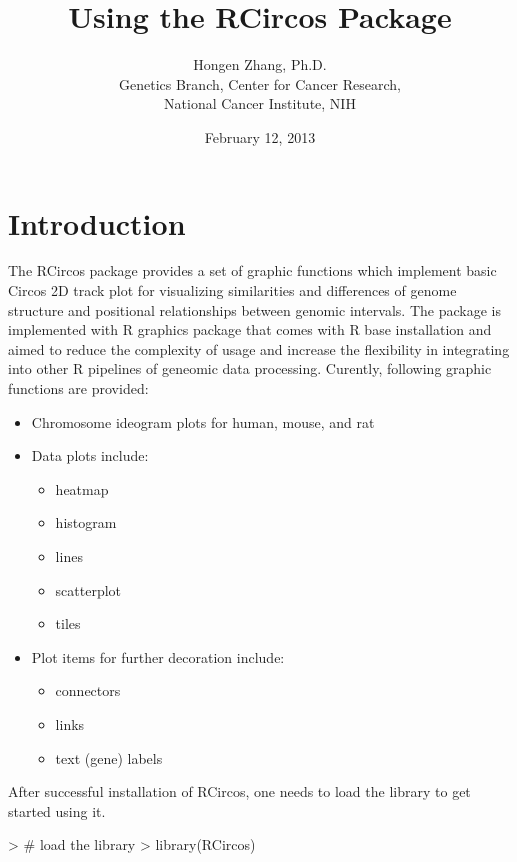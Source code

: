 \documentclass{article}
\begin{document}


\title{Using the RCircos Package}
\author{Hongen Zhang, Ph.D.\\
Genetics Branch, Center for Cancer Research,\\
National Cancer Institute, NIH}
\date{February 12, 2013}
\maketitle

\tableofcontents

\section{Introduction}

The RCircos package provides a set of graphic functions which implement basic Circos 2D track plot \cite{Krzywinski} for visualizing similarities and differences of genome structure and positional relationships between genomic intervals. The package is implemented with R graphics package that comes with R base installation and aimed to reduce the complexity of usage and increase the flexibility in integrating into other R pipelines of geneomic data processing. Curently, following graphic functions are provided: 

\begin{itemize}
\item
Chromosome ideogram plots for human, mouse, and rat
\item
Data plots include:
\begin{itemize}
  \item heatmap
  \item histogram 
  \item lines 
  \item scatterplot 
  \item tiles
\end{itemize}
\item
Plot items for further decoration include:
\begin{itemize}
  \item connectors
  \item links
  \item text (gene) labels
\end{itemize}
\end{itemize}

After successful installation of RCircos, one needs to load the library to get started using it.

\begin{Schunk}
\begin{Sinput}
> # load the library
> library(RCircos)
\end{Sinput}
\end{Schunk}
\end{document}
